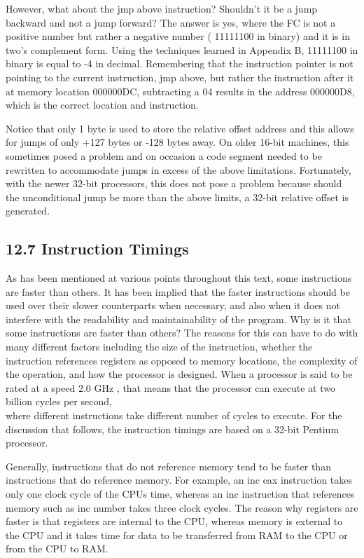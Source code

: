 \documentclass[10pt]{article}
\begin{document}
However, what about the jmp above instruction? Shouldn't it be a jump backward and not a jump forward? The answer is yes, where the FC is not a positive number but rather a negative number ( 11111100 in binary) and it is in two's complement form. Using the techniques learned in Appendix B, 11111100 in binary is equal to -4 in decimal. Remembering that the instruction pointer is not pointing to the current instruction, jmp above, but rather the instruction after it at memory location 000000DC, subtracting a 04 results in the address 000000D8, which is the correct location and instruction.

Notice that only 1 byte is used to store the relative offset address and this allows for jumps of only +127 bytes or -128 bytes away. On older 16-bit machines, this sometimes posed a problem and on occasion a code segment needed to be rewritten to accommodate jumps in excess of the above limitations. Fortunately, with the newer 32-bit processors, this does not pose a problem because should the unconditional jump be more than the above limits, a 32-bit relative offset is generated.

\subsection*{12.7 Instruction Timings}
As has been mentioned at various points throughout this text, some instructions are faster than others. It has been implied that the faster instructions should be used over their slower counterparts when necessary, and also when it does not interfere with the readability and maintainability of the program. Why is it that some instructions are faster than others? The reasons for this can have to do with many different factors including the size of the instruction, whether the instruction references registers as opposed to memory locations, the complexity of the operation, and how the processor is designed. When a processor is said to be rated at a speed 2.0 GHz , that means that the processor can execute at two billion cycles per second,\\
where different instructions take different number of cycles to execute. For the discussion that follows, the instruction timings are based on a 32-bit Pentium processor.

Generally, instructions that do not reference memory tend to be faster than instructions that do reference memory. For example, an inc eax instruction takes only one clock cycle of the CPUs time, whereas an inc instruction that references memory such as inc number takes three clock cycles. The reason why registers are faster is that registers are internal to the CPU, whereas memory is external to the CPU and it takes time for data to be transferred from RAM to the CPU or from the CPU to RAM.
\end{document}
